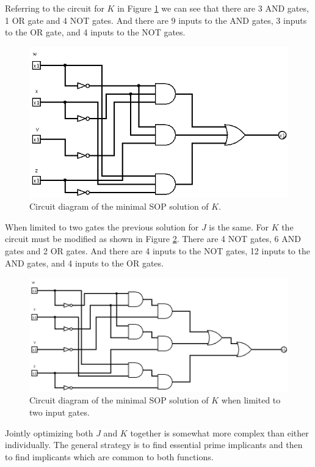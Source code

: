 \documentclass[12pt]{article}
\begin{document}
Referring to the circuit for $K$ in Figure \ref{fig:Kminsop-01} we
can see that there are 3 AND gates, 1 OR gate and 4 NOT gates.
And there are 9 inputs to the AND gates, 3 inputs to the OR gate,
and 4 inputs to the NOT gates.

\begin{figure}[!htb]
\center
\includegraphics[scale=0.5]{Kminsop-01}
\caption{Circuit diagram of the minimal SOP solution of $K$.}
\label{fig:Kminsop-01}
\end{figure}

When limited to two gates the previous solution for $J$ is the
same.
For $K$ the circuit must be modified as shown in Figure \ref{fig:Kminsop-02}.
There are 4 NOT gates, 6 AND gates and 2 OR gates.
And there are 4 inputs to the NOT gates, 12 inputs to the AND gates,
and 4 inputs to the OR gates.

\begin{figure}[!htb]
\center
\includegraphics[scale=0.5]{Kminsop-02}
\caption{Circuit diagram of the minimal SOP solution of $K$ when limited to two input gates.}
\label{fig:Kminsop-02}
\end{figure}

\clearpage

Jointly optimizing both $J$ and $K$ together is somewhat more complex than
either individually.
The general strategy is to find essential prime implicants and then to find
implicants which are common to both functions.
\end{document}
